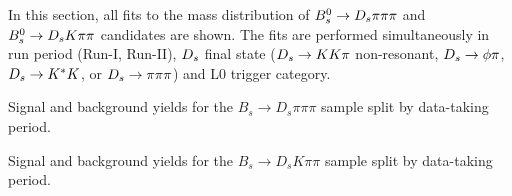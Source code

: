 \setcounter{figure}{0}
\setcounter{table}{0}

\renewcommand{\thefigure}{C.\arabic{figure}}
\renewcommand{\thetable}{C.\arabic{table}}

In this section, all fits to the mass distribution of ${{B}^0_{s}}\rightarrow{\ensuremath{{D}_{s}}}{\ensuremath{\pi}}{\ensuremath{\pi}}{\ensuremath{\pi}}$ and ${{B}^0_{s}}\rightarrow{\ensuremath{{D}_{s}}}{\ensuremath{K}}{\ensuremath{\pi}}{\ensuremath{\pi}}$ candidates are shown. 
The fits are performed simultaneously 
in run period (Run-I, Run-II), 
${{D}_{s}}$ final state  (${{D}_{s}}\rightarrow{\ensuremath{K}}{\ensuremath{K}}{\ensuremath{\pi}}$ non-resonant, ${{D}_{s}}\rightarrow\phi\pi$, ${{D}_{s}}\rightarrow{\ensuremath{{K}^*}}{\ensuremath{K}}$, or ${{D}_{s}}\rightarrow{\ensuremath{\pi}}{\ensuremath{\pi}}{\ensuremath{\pi}}$) 
and \textsf{L0} trigger category. 

\begin{table}[h]
\centering
\caption{Signal and background yields for the $B_s \to D_s \pi \pi \pi$ sample
split by data-taking period.}
 


\label{tab:massFitNormA}
\end{table}
\begin{table}[h]
\centering
\caption{Signal and background yields for the $B_s \to D_s K \pi \pi$ sample split by data-taking period.}
 


\label{tab:massFitSigA}
\end{table}

